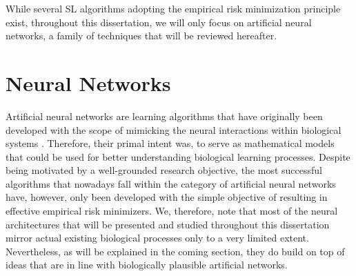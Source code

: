 While several SL algorithms adopting the empirical risk minimization principle exist, throughout this dissertation, we will only focus on artificial neural networks, a family of techniques that will be reviewed hereafter.  

\section{Neural Networks}
\label{sec:neural_networks}
Artificial neural networks are learning algorithms that have originally been developed with the scope of mimicking the neural interactions within biological systems \cite{mitchell1997machine}. Therefore, their primal intent was, to serve as mathematical models that could be used for better understanding biological learning processes. Despite being motivated by a well-grounded research objective, the most successful algorithms that nowadays fall within the category of artificial neural networks have, however, only been developed with the simple objective of resulting in effective empirical risk minimizers. We, therefore, note that most of the neural architectures that will be presented and studied throughout this dissertation mirror actual existing biological processes only to a very limited extent. Nevertheless, as will be explained in the coming section, they do build on top of ideas that are in line with biologically plausible artificial networks.   

